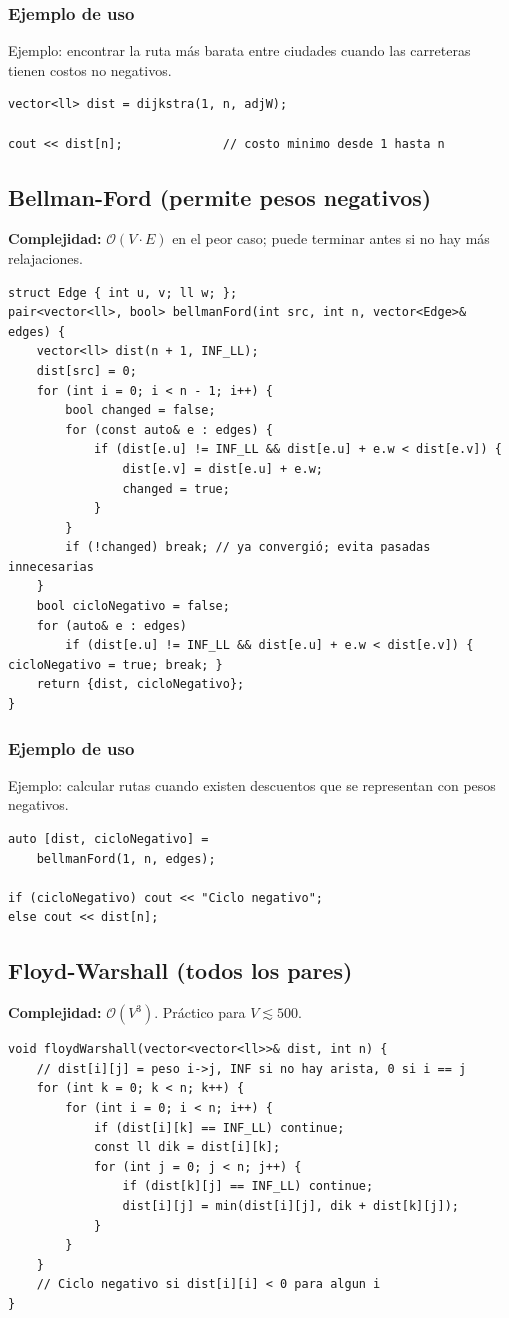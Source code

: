 \documentclass[10pt,twocolumn,letterpaper]{report}
\begin{document}
\subsubsection*{Ejemplo de uso}
Ejemplo: encontrar la ruta más barata entre ciudades cuando las carreteras tienen costos no negativos.
\begin{lstlisting}
vector<ll> dist = dijkstra(1, n, adjW);

cout << dist[n];              // costo minimo desde 1 hasta n
\end{lstlisting}


\subsection{Bellman-Ford (permite pesos negativos)}
\textbf{Complejidad:} $\mathcal{O}(V \cdot E)$ en el peor caso; puede terminar antes si no hay más relajaciones.
\begin{lstlisting}
struct Edge { int u, v; ll w; };
pair<vector<ll>, bool> bellmanFord(int src, int n, vector<Edge>& edges) {
    vector<ll> dist(n + 1, INF_LL);
    dist[src] = 0;
    for (int i = 0; i < n - 1; i++) {
        bool changed = false;
        for (const auto& e : edges) {
            if (dist[e.u] != INF_LL && dist[e.u] + e.w < dist[e.v]) {
                dist[e.v] = dist[e.u] + e.w;
                changed = true;
            }
        }
        if (!changed) break; // ya convergió; evita pasadas innecesarias
    }
    bool cicloNegativo = false;
    for (auto& e : edges)
        if (dist[e.u] != INF_LL && dist[e.u] + e.w < dist[e.v]) { cicloNegativo = true; break; }
    return {dist, cicloNegativo};
}
\end{lstlisting}
\subsubsection*{Ejemplo de uso}
Ejemplo: calcular rutas cuando existen descuentos que se representan con pesos negativos.
\begin{lstlisting}
auto [dist, cicloNegativo] =
    bellmanFord(1, n, edges);

if (cicloNegativo) cout << "Ciclo negativo";
else cout << dist[n];
\end{lstlisting}


\subsection{Floyd-Warshall (todos los pares)}
\textbf{Complejidad:} $\mathcal{O}(V^3)$. Práctico para $V \lesssim 500$.
\begin{lstlisting}
void floydWarshall(vector<vector<ll>>& dist, int n) {
    // dist[i][j] = peso i->j, INF si no hay arista, 0 si i == j
    for (int k = 0; k < n; k++) {
        for (int i = 0; i < n; i++) {
            if (dist[i][k] == INF_LL) continue;
            const ll dik = dist[i][k];
            for (int j = 0; j < n; j++) {
                if (dist[k][j] == INF_LL) continue;
                dist[i][j] = min(dist[i][j], dik + dist[k][j]);
            }
        }
    }
    // Ciclo negativo si dist[i][i] < 0 para algun i
}
\end{lstlisting}
\end{document}

